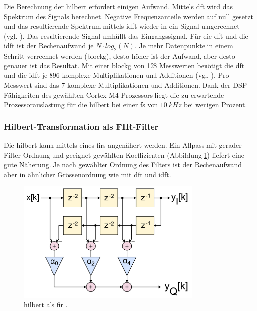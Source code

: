Die Berechnung der \gls{hilbert} erfordert einigen Aufwand. Mittels \gls{dft} wird das Spektrum des Signals berechnet. Negative Frequenzanteile werden auf null gesetzt und das resultierende Spektrum mittels \gls{idft} wieder in ein Signal umgerechnet (vgl. \cite{wiki_hilbert}). Das resultierende Signal umhüllt das Eingangssignal. 
Für die \gls{dft} und die \gls{idft} ist der Rechenaufwand je \ensuremath{N \cdot log_2(N)}. Je mehr Datenpunkte in einem Schritt verrechnet werden (\gls{blockg}), desto höher ist der Aufwand, aber desto genauer ist das Resultat. Mit einer \gls{blockg} von 128 Messwerten benötigt die \gls{dft} und die \gls{idft} je 896 komplexe Multiplikationen und Additionen (vgl. \cite[Kap. 3, S. 48]{dsv1_hilbert}). Pro Messwert sind das 7 komplexe Multiplikationen und Additionen. Dank der DSP-Fähigkeiten des gewählten Cortex\texttrademark -M4 Prozessors liegt die zu erwartende Prozessorauslastung für die \gls{hilbert} bei einer \gls{fs} von \ensuremath{10~kHz} bei wenigen Prozent.

\subsubsection{Hilbert-Transformation als FIR-Filter}
Die \gls{hilbert} kann mittels eines \gls{fir}s angenähert werden. Ein Allpass mit gerader Filter-Ordnung und geeignet gewählten Koeffizienten (Abbildung \ref{fig.hilbertFIR}) liefert eine gute Näherung. Je nach gewählter Ordnung des Filters ist der Rechenaufwand aber in ähnlicher Grössenordnung wie mit \gls{dft} und \gls{idft}.
\begin{figure}
	\centering
		\includegraphics[width=0.8\textwidth]{images/FIR_Hilbert_Transform_Filter.png}
	\caption{\gls{hilbert} als \gls{fir} \cite{wiki_hilbertFIR}.}
	\label{fig.hilbertFIR}
\end{figure}

